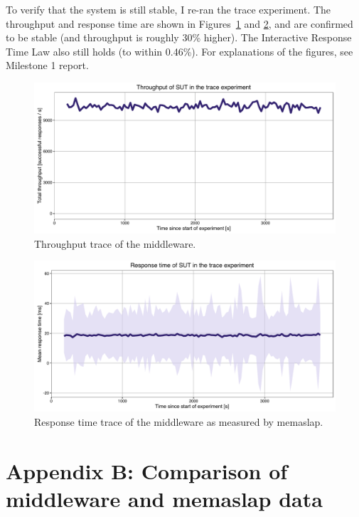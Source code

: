 \documentclass[11pt]{article}
\begin{document}
To verify that the system is still stable, I re-ran the trace experiment. The throughput and response time are shown in Figures~\ref{fig:trace:throughput} and \ref{fig:trace:responsetime}, and are confirmed to be stable (and throughput is roughly 30\% higher). The Interactive Response Time Law also still holds (to within 0.46\%). For explanations of the figures, see Milestone 1 report.

\begin{figure}[h]
\centering
\includegraphics[width=\textwidth]{../results/trace_rep3/graphs/throughput.pdf}
\caption{Throughput trace of the middleware.}
\label{fig:trace:throughput}
\end{figure}

\begin{figure}[h]
\centering
\includegraphics[width=\textwidth]{../results/trace_rep3/graphs/responsetime.pdf}
\caption{Response time trace of the middleware as measured by memaslap.}
\label{fig:trace:responsetime}
\end{figure}


\clearpage

\section*{Appendix B: Comparison of middleware and memaslap data}
\label{sec:appb}
\end{document}
